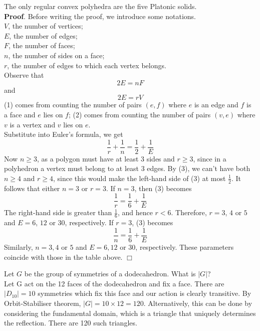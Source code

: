 \documentclass[../main.tex]{subfiles}
\begin{document}
\begin{theorem}\cite{liebeck2019concise}
The only regular convex polyhedra are the five Platonic solids.\\
\textbf{Proof}. Before writing the proof, we introduce some notations.\\
$V$, the number of vertices;\\
$E$, the number of edges;\\
$F$, the number of faces;\\
$n$, the number of sides on a face;\\
$r$, the number of edges to which each vertex belongs.\\
Observe that 
\begin{equation}\label{eqn_1}
2E=nF
\end{equation}
and
\begin{equation}\label{eqn_2}
2E=rV
\end{equation}
(1) comes from counting the number of pairs $(e,f)$ where $e$ is an edge and $f$ is a face and $e$ lies on $f$; (2) comes from counting the number of pairs $(v,e)$ where $v$ is a vertex and $v$ lies on $e$.\\
Substitute into Euler's formula, we get 
\begin{equation}\label{eqn_3}
\frac{1}{r}+\frac{1}{n}=\frac{1}{2}+\frac{1}{E}
\end{equation}
Now $n\geq 3$, as a polygon must have at least $3$ sides and $r\geq 3$, since in a polyhedron a vertex must belong to at least $3$ edges. By (3), we can't have both $n\geq 4$ and $r \geq 4$, since this would make the left-hand side of (3) at most $\frac{1}{2}$.
It follows that either $n = 3$ or $r = 3$.
If $n = 3$, then (3) becomes
\begin{equation}\label{eqn_4}
\frac{1}{r}=\frac{1}{6}+\frac{1}{E}
\end{equation}
The right-hand side is greater than $\frac{1}{6}$, and hence $r < 6$. Therefore, $r = 3$, $4$ or $5$ and $E = 6$, $12$ or $30$, respectively.
If $r = 3$, (3) becomes
\begin{equation}\label{eqn_5}
\frac{1}{n}=\frac{1}{6}+\frac{1}{E}
\end{equation}
Similarly, $n = 3,4$ or $5$ and $E = 6,12$ or $30$, respectively.
These parameters coincide with those in the table above.
\hfill\(\Box\)
\end{theorem}

\begin{example}
Let $G$ be the group of symmetries of a dodecahedron. What is $|G|$?\\
Let G act on the 12 faces of the dodecahedron and fix a face. There are $|D_{10}|=10$ symmetries which fix this face and our action is clearly transitive. By Orbit-Stabiliser theorem, $|G|=10\times12=120.$
Alternatively, this can be done by considering the fundamental domain, which is a triangle that uniquely determines the reflection. There are 120 such triangles.
\end{example}
\end{document}
